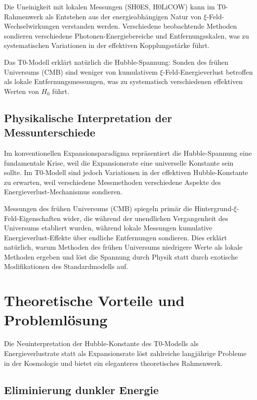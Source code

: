	Die Uneinigkeit mit lokalen Messungen (SH0ES, H0LiCOW) kann im T0-Rahmenwerk als Entstehen aus der energieabhängigen Natur von $\xi$-Feld-Wechselwirkungen verstanden werden. Verschiedene beobachtende Methoden sondieren verschiedene Photonen-Energiebereiche und Entfernungsskalen, was zu systematischen Variationen in der effektiven Kopplungsstärke führt.
	
	\begin{experimental}
		Das T0-Modell erklärt natürlich die Hubble-Spannung: Sonden des frühen Universums (CMB) sind weniger von kumulativem $\xi$-Feld-Energieverlust betroffen als lokale Entfernungsmessungen, was zu systematisch verschiedenen effektiven Werten von $H_0$ führt.
	\end{experimental}
	
	\subsection{Physikalische Interpretation der Messunterschiede}
	
	Im konventionellen Expansionsparadigma repräsentiert die Hubble-Spannung eine fundamentale Krise, weil die Expansionsrate eine universelle Konstante sein sollte. Im T0-Modell sind jedoch Variationen in der effektiven Hubble-Konstante zu erwarten, weil verschiedene Messmethoden verschiedene Aspekte des Energieverlust-Mechanismus sondieren.
	
	Messungen des frühen Universums (CMB) spiegeln primär die Hintergrund-$\xi$-Feld-Eigenschaften wider, die während der unendlichen Vergangenheit des Universums etabliert wurden, während lokale Messungen kumulative Energieverlust-Effekte über endliche Entfernungen sondieren. Dies erklärt natürlich, warum Methoden des frühen Universums niedrigere Werte als lokale Methoden ergeben und löst die Spannung durch Physik statt durch exotische Modifikationen des Standardmodells auf.
	
	\section{Theoretische Vorteile und Problemlösung}
	
	Die Neuinterpretation der Hubble-Konstante des T0-Modells als Energieverlustrate statt als Expansionsrate löst zahlreiche langjährige Probleme in der Kosmologie und bietet ein eleganteres theoretisches Rahmenwerk.
	
	\subsection{Eliminierung dunkler Energie}
	
